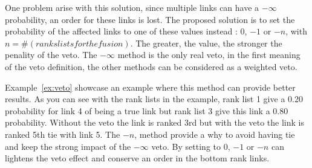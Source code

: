 One problem arise with this solution, since multiple links can have a $-\infty$ probability, an order for these links is lost.
The proposed solution is to set the probability of the affected links to one of these values instead : $0$, $-1$ or $-n$, with $n = \#(ranks lists for the fusion)$.
The greater, the value, the stronger the penality of the veto.
The $-\infty$ method is the only real veto, in the first meaning of the veto definition, the other methods can be considered as a weighted veto.

Example~\ref{ex:veto} showcase an example where this method can provide better results.
As you can see with the rank lists in the example, rank list 1 give a 0.20 probability for link 4 of being a true link but rank list 3 give this link a 0.80 probability.
Without the veto the link is ranked 3rd but with the veto the link is ranked 5th tie with link 5.
The $-n$, method provide a why to avoid having tie and keep the strong impact of the $-\infty$ veto.
By setting to $0$, $-1$ or $-n$ can lightens the veto effect and conserve an order in the bottom rank links.

